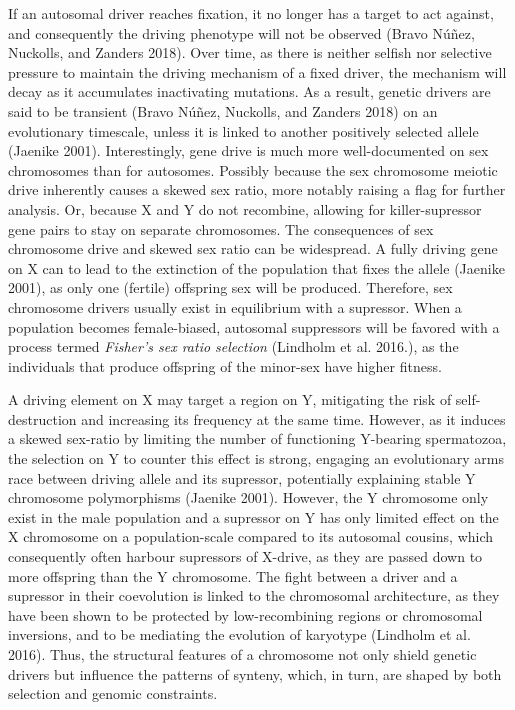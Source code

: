\documentclass[
  11pt,
  a4paper,
]{scrbook}
\begin{document}
If an autosomal driver reaches fixation, it no longer has a target to
act against, and consequently the driving phenotype will not be observed
(Bravo Núñez, Nuckolls, and Zanders 2018). Over time, as there is
neither selfish nor selective pressure to maintain the driving mechanism
of a fixed driver, the mechanism will decay as it accumulates
inactivating mutations. As a result, genetic drivers are said to be
transient (Bravo Núñez, Nuckolls, and Zanders 2018) on an evolutionary
timescale, unless it is linked to another positively selected allele
(Jaenike 2001). Interestingly, gene drive is much more well-documented
on sex chromosomes than for autosomes. Possibly because the sex
chromosome meiotic drive inherently causes a skewed sex ratio, more
notably raising a flag for further analysis. Or, because X and Y do not
recombine, allowing for killer-supressor gene pairs to stay on separate
chromosomes. The consequences of sex chromosome drive and skewed sex
ratio can be widespread. A fully driving gene on X can to lead to the
extinction of the population that fixes the allele (Jaenike 2001), as
only one (fertile) offspring sex will be produced. Therefore, sex
chromosome drivers usually exist in equilibrium with a supressor. When a
population becomes female-biased, autosomal suppressors will be favored
with a process termed \emph{Fisher's sex ratio selection} (Lindholm et
al. 2016.), as the individuals that produce offspring of the minor-sex
have higher fitness.

A driving element on X may target a region on Y, mitigating the risk of
self-destruction and increasing its frequency at the same time. However,
as it induces a skewed sex-ratio by limiting the number of functioning
Y-bearing spermatozoa, the selection on Y to counter this effect is
strong, engaging an evolutionary arms race between driving allele and
its supressor, potentially explaining stable Y chromosome polymorphisms
(Jaenike 2001). However, the Y chromosome only exist in the male
population and a supressor on Y has only limited effect on the X
chromosome on a population-scale compared to its autosomal cousins,
which consequently often harbour supressors of X-drive, as they are
passed down to more offspring than the Y chromosome. The fight between a
driver and a supressor in their coevolution is linked to the chromosomal
architecture, as they have been shown to be protected by low-recombining
regions or chromosomal inversions, and to be mediating the evolution of
karyotype (Lindholm et al. 2016). Thus, the structural features of a
chromosome not only shield genetic drivers but influence the patterns of
synteny, which, in turn, are shaped by both selection and genomic
constraints.
\end{document}
